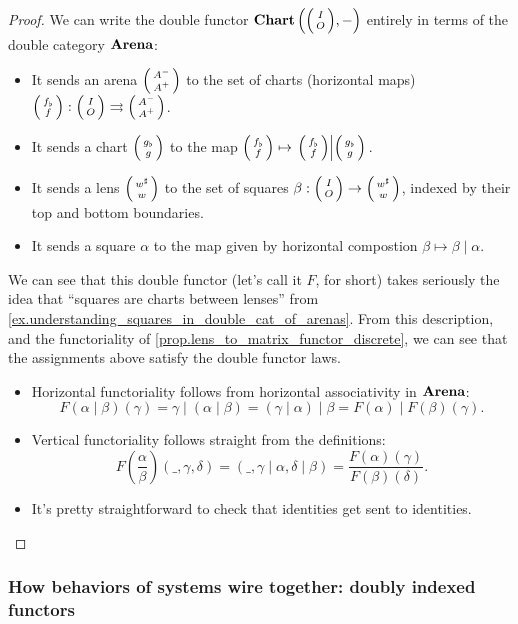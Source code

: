 \documentclass[DynamicalBook]{subfiles}
\begin{document}
\begin{proof}
 

We can write the double functor $\Cat{Chart}\left(\littlelens{I}{O}, - \right)$
entirely in terms of the double category $\textbf{Arena}$:
\begin{itemize}
  \item It sends an arena $\lens{A^-}{A^+}$ to the set of charts (horizontal
    maps) $\lens{f_{\flat}}{f} : \lens{I}{O}  \tto \lens{A^-}{A^+}$.
  \item It sends a chart $\lens{g_{\flat}}{g}$ to the map $\lens{f_{\flat}}{f}
    \mapsto \left. \lens{f_{\flat}}{f} \middle| \lens{g_{\flat}}{g} \right.$.
  \item It sends a lens $\lens{w^{\sharp}}{w}$ to the set of squares $\beta :
    \lens{I}{O} \to \lens{w^{\sharp}}{w}$, indexed by their top and bottom
    boundaries.
  \item It sends a square $\alpha$ to the map given by horizontal compostion
    $\beta \mapsto \beta \mid \alpha$.
\end{itemize}

We can see that this double functor (let's call it $F$, for short) takes seriously the idea that ``squares are
charts between lenses'' from
\cref{ex.understanding_squares_in_double_cat_of_arenas}. From this description,
and the functoriality of \cref{prop.lens_to_matrix_functor_discrete}, we can see
that the assignments above satisfy the double functor laws. 
\begin{itemize}
  \item Horizontal functoriality follows from horizontal associativity in
    $\textbf{Arena}$:
$$F(\alpha\mid \beta)(\gamma) = \gamma \mid (\alpha \mid \beta) = (\gamma \mid
\alpha) \mid \beta = F(\alpha) \mid F(\beta) (\gamma).$$
\item Vertical functoriality follows straight from the definitions:
  $$F\left( \frac{\alpha}{\beta} \right)(\_, \gamma, \delta) = (\_, \gamma \mid
  \alpha, \delta \mid \beta) = \frac{F(\alpha)(\gamma)}{F(\beta)(\delta)}.$$
\item It's pretty straightforward to check that identities get sent to identities.
\end{itemize}
\end{proof}



\subsubsection{How behaviors of systems wire together: doubly indexed functors}
\end{document}
